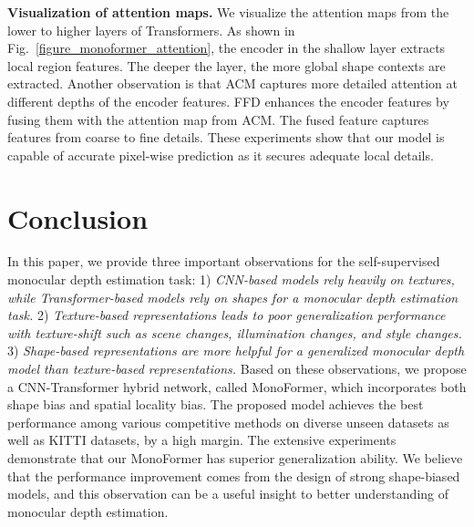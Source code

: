 \documentclass[letterpaper]{article} \usepackage{aaai23}  \usepackage{times}  \usepackage{helvet}  \usepackage{courier}  \usepackage[hyphens]{url}  \usepackage{graphicx} \urlstyle{rm} \def\UrlFont{\rm}  \usepackage{natbib}  \usepackage{caption} \frenchspacing  \setlength{\pdfpagewidth}{8.5in} \setlength{\pdfpageheight}{11in} \usepackage{algorithm}
\newcommand{\figref}[1]{Fig.~\ref{#1}}
\begin{document}
\noindent \textbf{Visualization of attention maps.}
We visualize the attention maps from the lower to higher layers of Transformers. As shown in \figref{figure_monoformer_attention}, the encoder in the shallow layer extracts local region features. The deeper the layer, the more global shape contexts are extracted. Another observation is that ACM captures more detailed attention at different depths of the encoder features. FFD enhances the encoder features by fusing them with the attention map from ACM. The fused feature captures features from coarse to fine details. These experiments show that our model is capable of accurate pixel-wise prediction as it secures adequate local details. 

\section{Conclusion}
\label{conclusion}
\begin{table}[t]
    \centering
    \caption{\textbf{Ablation study on ACM and FFD.} Both is with ACM and FFD.}
    \label{table_result_modules}
\end{table}
In this paper, we provide three important observations for the self-supervised monocular depth estimation task: 1) \textit{ CNN-based models rely heavily on textures, while Transformer-based models rely on shapes for a monocular depth estimation task.} 2) \textit{Texture-based representations leads to poor generalization performance with texture-shift such as scene changes, illumination changes, and style changes.} 3) \textit{Shape-based representations are more helpful for a generalized monocular depth model than texture-based representations.}
Based on these observations, we propose a CNN-Transformer hybrid network, called MonoFormer, which incorporates both shape bias and spatial locality bias. The proposed model achieves the best performance among various competitive methods on diverse unseen datasets as well as KITTI datasets, by a high margin. The extensive experiments demonstrate that our MonoFormer has superior generalization ability.
We believe that the performance improvement comes from the design of strong shape-biased models, and this observation can be a useful insight to better understanding of monocular depth estimation. 
\end{document}
